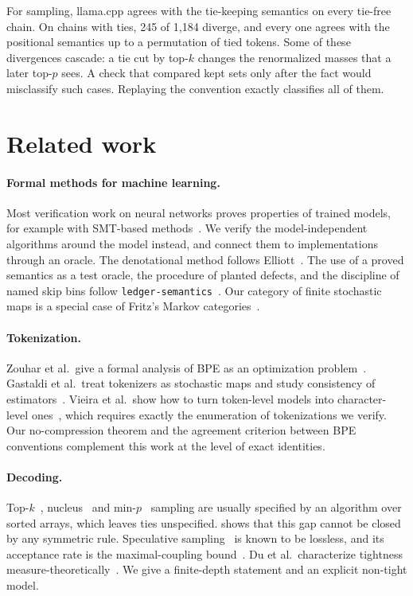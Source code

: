 \documentclass[10pt]{article}
\theoremstyle{qpt}
\begin{document}
For sampling, llama.cpp agrees with the tie-keeping semantics on every tie-free
chain. On chains with ties, 245 of 1{,}184 diverge, and every one agrees with the
positional semantics up to a permutation of tied tokens. Some of these divergences
cascade: a tie cut by top-$k$ changes the renormalized masses that a later top-$p$
sees. A check that compared kept sets only after the fact would misclassify such
cases. Replaying the convention exactly classifies all of them.

\section{Related work}

\paragraph{Formal methods for machine learning.} Most verification work on neural
networks proves properties of trained models, for example with SMT-based
methods~\cite{katz2017reluplex}. We verify the model-independent algorithms around
the model instead, and connect them to implementations through an oracle. The
denotational method follows Elliott~\cite{elliott2009denotational}. The use of a
proved semantics as a test oracle, the procedure of planted defects, and the
discipline of named skip bins follow \texttt{ledger-semantics}~\cite{ledgersemantics}.
Our category of finite stochastic maps is a special case of Fritz's Markov
categories~\cite{fritz2020markov}.

\paragraph{Tokenization.} Zouhar et al.\ give a formal analysis of BPE as an
optimization problem~\cite{zouhar2023bpe}. Gastaldi et al.\ treat tokenizers as
stochastic maps and study consistency of estimators~\cite{gastaldi2024foundations}.
Vieira et al.\ show how to turn token-level models into character-level
ones~\cite{vieira2024tokens}, which requires exactly the enumeration of
tokenizations we verify. Our no-compression theorem and the agreement criterion
between BPE conventions complement this work at the level of exact identities.

\paragraph{Decoding.} Top-$k$~\cite{fan2018hierarchical}, nucleus~\cite{holtzman2020curious}
and min-$p$~\cite{nguyen2025minp} sampling are usually specified by an algorithm over
sorted arrays, which leaves ties unspecified.  shows that this gap
cannot be closed by any symmetric rule. Speculative
sampling~\cite{leviathan2023speculative,chen2023speculative} is known to be lossless,
and its acceptance rate is the maximal-coupling bound~\cite{lindvall1992coupling}. Du et
al.\ characterize tightness measure-theoretically~\cite{du2023tight}. We give a
finite-depth statement and an explicit non-tight model.
\end{document}
